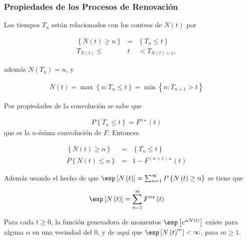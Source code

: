%
\subsubsection{Propiedades de los Procesos de Renovaci\'on}
%

Los tiempos $T_{n}$ est\'an relacionados con los conteos de $N\left(t\right)$ por

\begin{eqnarray*}
\left\{N\left(t\right)\geq n\right\}&=&\left\{T_{n}\leq t\right\}\\
T_{N\left(t\right)}\leq &t&<T_{N\left(t\right)+1},
\end{eqnarray*}

adem\'as $N\left(T_{n}\right)=n$, y 

\begin{eqnarray*}
N\left(t\right)=\max\left\{n:T_{n}\leq t\right\}=\min\left\{n:T_{n+1}>t\right\}
\end{eqnarray*}

Por propiedades de la convoluci\'on se sabe que

\begin{eqnarray*}
P\left\{T_{n}\leq t\right\}=F^{n\star}\left(t\right)
\end{eqnarray*}
que es la $n$-\'esima convoluci\'on de $F$. Entonces 

\begin{eqnarray*}
\left\{N\left(t\right)\geq n\right\}&=&\left\{T_{n}\leq t\right\}\\
P\left\{N\left(t\right)\leq n\right\}&=&1-F^{\left(n+1\right)\star}\left(t\right)
\end{eqnarray*}

Adem\'as usando el hecho de que $\esp\left[N\left(t\right)\right]=\sum_{n=1}^{\infty}P\left\{N\left(t\right)\geq n\right\}$
se tiene que

\begin{eqnarray*}
\esp\left[N\left(t\right)\right]=\sum_{n=1}^{\infty}F^{n\star}\left(t\right)
\end{eqnarray*}

\begin{Prop}
Para cada $t\geq0$, la funci\'on generadora de momentos $\esp\left[e^{\alpha N\left(t\right)}\right]$ existe para alguna $\alpha$ en una vecindad del 0, y de aqu\'i que $\esp\left[N\left(t\right)^{m}\right]<\infty$, para $m\geq1$.
\end{Prop}


